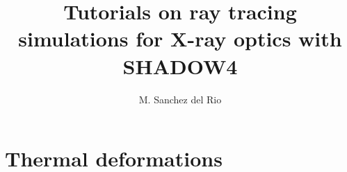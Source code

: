\documentclass{ol-softwaremanual}
\title{Tutorials on ray tracing simulations for X-ray optics with SHADOW4}
\author{M. Sanchez del Rio}
\begin{document}
\maketitle

\tableofcontents

\newpage
\section{Thermal deformations}


\end{document}
